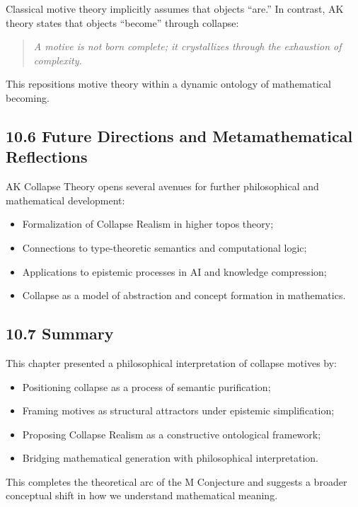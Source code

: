 \documentclass[11pt]{article}
\begin{document}
Classical motive theory implicitly assumes that objects “are.” In contrast, AK theory states that objects “become” through collapse:

\begin{quote}
\emph{A motive is not born complete; it crystallizes through the exhaustion of complexity.}
\end{quote}

This repositions motive theory within a dynamic ontology of mathematical becoming.

\subsection{10.6 Future Directions and Metamathematical Reflections}

AK Collapse Theory opens several avenues for further philosophical and mathematical development:

\begin{itemize}
    \item Formalization of Collapse Realism in higher topos theory;
    \item Connections to type-theoretic semantics and computational logic;
    \item Applications to epistemic processes in AI and knowledge compression;
    \item Collapse as a model of abstraction and concept formation in mathematics.
\end{itemize}

\subsection{10.7 Summary}

This chapter presented a philosophical interpretation of collapse motives by:

\begin{itemize}
    \item Positioning collapse as a process of semantic purification;
    \item Framing motives as structural attractors under epistemic simplification;
    \item Proposing Collapse Realism as a constructive ontological framework;
    \item Bridging mathematical generation with philosophical interpretation.
\end{itemize}

This completes the theoretical arc of the M Conjecture and suggests a broader conceptual shift in how we understand mathematical meaning.
\end{document}
